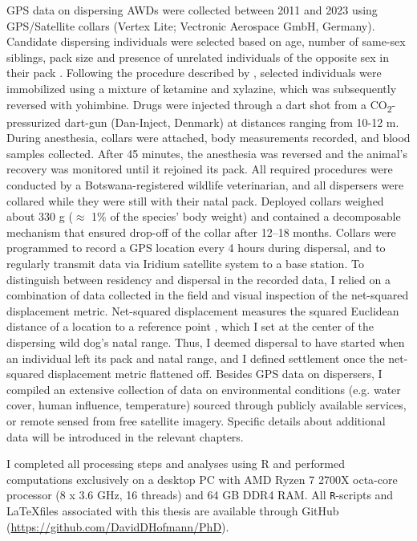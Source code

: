 \documentclass[../FinalThesis.tex]{subfiles}
\begin{document}
GPS data on dispersing AWDs were collected between 2011 and 2023 using
GPS/Satellite collars (Vertex Lite; Vectronic Aerospace GmbH, Germany).
Candidate dispersing individuals were selected based on age, number of same-sex
siblings, pack size and presence of unrelated individuals of the opposite sex in
their pack \citep{McNutt.1996, Behr.2020}. Following the procedure described by
\citet{Osofsky.1996}, selected individuals were immobilized using a mixture of
ketamine and xylazine, which was subsequently reversed with yohimbine. Drugs
were injected through a dart shot from a CO\textsubscript{2}-pressurized
dart-gun (Dan-Inject, Denmark) at distances ranging from 10-12 m. During
anesthesia, collars were attached, body measurements recorded, and blood samples
collected. After 45 minutes, the anesthesia was reversed and the animal's
recovery was monitored until it rejoined its pack. All required procedures were
conducted by a Botswana-registered wildlife veterinarian, and all dispersers
were collared while they were still with their natal pack. Deployed collars
weighed about 330 g ($\approx$ 1\% of the species' body weight) and contained a
decomposable mechanism that ensured drop-off of the collar after 12–18 months.
Collars were programmed to record a GPS location every 4 hours during dispersal,
and to regularly transmit data via Iridium satellite system to a base station.
To distinguish between residency and dispersal in the recorded data, I relied on
a combination of data collected in the field and visual inspection of the
net-squared displacement metric. Net-squared displacement measures the squared
Euclidean distance of a location to a reference point \citep{Borger.2012}, which
I set at the center of the dispersing wild dog's natal range. Thus, I deemed
dispersal to have started when an individual left its pack and natal range, and
I defined settlement once the net-squared displacement metric flattened off.
Besides GPS data on dispersers, I compiled an extensive collection of data on
environmental conditions (e.g. water cover, human influence, temperature)
sourced through publicly available services, or remote sensed from free
satellite imagery. Specific details about additional data will be introduced in
the relevant chapters.

I completed all processing steps and analyses using R \citep{RCoreTeam.2023} and
performed computations exclusively on a desktop PC with AMD Ryzen 7 2700X
octa-core processor (8 x 3.6 GHz, 16 threads) and 64 GB DDR4 RAM. All
\texttt{R}-scripts and \LaTeX files associated with this thesis are available
through GitHub (\url{https://github.com/DavidDHofmann/PhD}).
\end{document}
